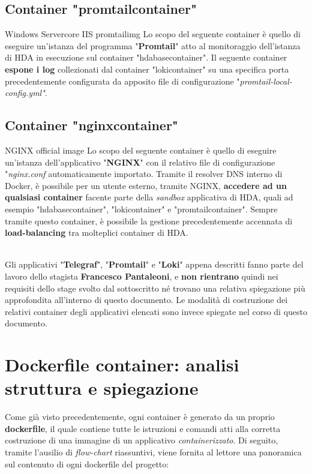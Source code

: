 \subsection{Container "promtailcontainer"}
\begin{namespacedesc}
	 {Windows Servercore IIS}
	 {promtailimg}
	 {Lo scopo del seguente container è quello di eseguire un'istanza del programma "\textbf{Promtail}" atto al monitoraggio dell'istanza di HDA in esecuzione sul container "hdabasecontainer". Il seguente container \textbf{espone i log} collezionati dal container "lokicontainer" su una specifica porta precedentemente configurata da apposito file di configurazione "\textit{promtail-local-config.yml"}}.
\end{namespacedesc}	

\subsection{Container "nginxcontainer"}
\begin{namespacedesc}
	 {NGINX official image}
	 {Lo scopo del seguente container è quello di eseguire un'istanza dell'applicativo "\textbf{NGINX}" con il relativo file di configurazione "\textit{nginx.conf} automaticamente importato. Tramite il resolver DNS interno di Docker, è possibile per un utente esterno, tramite NGINX, \textbf{accedere ad un qualsiasi container} facente parte della \textit{sandbox} applicativa di HDA, quali ad esempio "hdabasecontainer", "lokicontainer" e "promtailcontainer". Sempre tramite questo container, è possibile la gestione precedentemente accennata di \textbf{load-balancing} tra molteplici container di HDA.}
\end{namespacedesc}
\\
Gli applicativi "\textbf{Telegraf}", "\textbf{Promtail}" e "\textbf{Loki}" appena descritti fanno parte del lavoro dello stagista \textbf{Francesco Pantaleoni}, e \textbf{non rientrano} quindi nei requisiti dello stage svolto dal sottoscritto né trovano una relativa spiegazione più approfondita all'interno di questo documento. Le modalità di costruzione dei relativi container degli applicativi elencati sono invece spiegate nel corso di questo documento.

\newpage	

\section{Dockerfile container: analisi struttura e spiegazione}
Come già visto precedentemente, ogni container è generato da un proprio \textbf{dockerfile}, il quale contiene tutte le istruzioni e comandi atti alla corretta costruzione di una immagine di un applicativo \textit{containerizzato}.
Di seguito, tramite l'ausilio di \textit{\gls{flow-chart}} riassuntivi, viene fornita al lettore una panoramica sul contenuto di ogni dockerfile del progetto:
